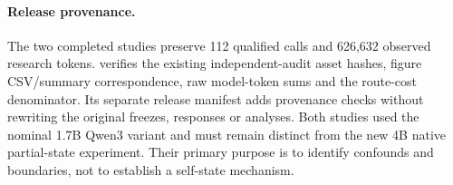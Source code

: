 \documentclass[10pt]{article}
\begin{document}
\paragraph{Release provenance.} The two completed studies preserve 112 qualified calls and 626,632 observed research tokens. \protect{} verifies the existing independent-audit asset hashes, figure CSV/summary correspondence, raw model-token sums and the route-cost denominator. Its separate release manifest adds provenance checks without rewriting the original freezes, responses or analyses. Both studies used the nominal 1.7B Qwen3 variant and must remain distinct from the new 4B native partial-state experiment. Their primary purpose is to identify confounds and boundaries, not to establish a self-state mechanism.
\end{document}
